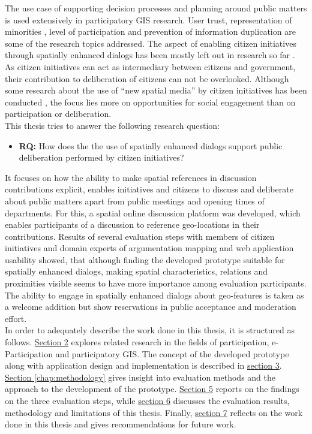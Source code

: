 The use case of supporting decision processes and planning around public matters is used extensively in participatory GIS research. User trust, representation of minorities \cite{Carver2001_PPGIS_Cyberdemocracy}, level of participation \cite{Steinmann2005_Combination_Ladder_GIS} and prevention of information duplication \cite{Hopfer2007_Communication} are some of the research topics addressed. The aspect of enabling citizen initiatives through spatially enhanced dialogs has been mostly left out in research so far \cite{Cai2009_spatial_annotation_deliberation}. As citizen initiatives can act as intermediary between citizens and government, their contribution to deliberation of citizens can not be overlooked. Although some research about the use of ``new spatial media'' by citizen initiatives has been conducted \cite{Elwood2013_NewSpatialMedia}, the focus lies more on opportunities for social engagement than on participation or deliberation.\\
This thesis tries to answer the following research question:
\begin{itemize}
  \item[] \textbf{RQ:} How does the the use of spatially enhanced dialogs support public deliberation performed by citizen initiatives?
\end{itemize}
It focuses on how the ability to make spatial references in discussion contributions explicit, enables initiatives and citizens to discuss and deliberate about public matters apart from public meetings and opening times of departments. For this, a spatial online discussion platform was developed, which enables participants of a discussion to reference geo-locations in their contributions. Results of several evaluation steps with members of citizen initiatives and domain experts of argumentation mapping and web application usability showed, that although finding the developed prototype suitable for spatially enhanced dialogs, making spatial characteristics, relations and proximities visible seems to have more importance among evaluation participants. The ability to engage in spatially enhanced dialogs about geo-features is taken as a welcome addition but show reservations in public acceptance and moderation effort.\\
In order to adequately describe the work done in this thesis, it is structured as follows. \hyperref[chap:related_work]{Section 2} explores related research in the fields of participation, e-Participation and participatory GIS. The concept of the developed prototype along with application design and implementation is described in \hyperref[chap:approach]{section 3}. \hyperref[chap:methodology]{Section \ref{chap:methodology}} gives insight into evaluation methods and the approach to the development of the prototype. \hyperref[chap:methodology]{Section 5} reports on the findings on the three evaluation steps, while \hyperref[chap:discussion]{section 6} discusses the evaluation results, methodology and limitations of this thesis. Finally, \hyperref[chap:conclusion]{section 7} reflects on the work done in this thesis and gives recommendations for future work.
